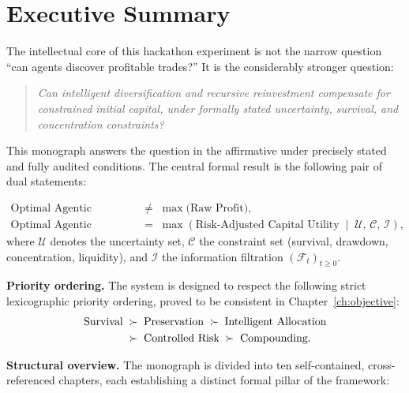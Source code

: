 \documentclass[12pt,openany]{book}
\numberwithin{equation}{chapter}
\theoremstyle{plain}
\theoremstyle{definition}
\theoremstyle{remark}
\numberwithin{equation}{chapter}
\theoremstyle{plain}
\begin{document}
\chapter*{Executive Summary}

\noindent
The intellectual core of this hackathon experiment is not the narrow
question ``can agents discover profitable trades?''  It is the
considerably stronger question:

\begin{quote}
\emph{Can intelligent diversification and recursive reinvestment
compensate for constrained initial capital, under formally
stated uncertainty, survival, and concentration constraints?}
\end{quote}

\noindent
This monograph answers the question in the affirmative under precisely
stated and fully audited conditions.  The central formal result is the
following pair of dual statements:

\begin{align}
  \text{Optimal Agentic Trading}
    &\;\neq\; \max\!\bigl(\text{Raw Profit}\bigr),
  \label{eq:exec-neq} \\[4pt]
  \text{Optimal Agentic Trading}
    &\;=\; \max\!\left(
        \text{Risk-Adjusted Capital Utility}
        \;\middle|\;
        \mathcal{U},\, \mathcal{C},\, \mathcal{I}
      \right),
  \label{eq:exec-eq}
\end{align}
where $\mathcal{U}$ denotes the uncertainty set,
$\mathcal{C}$ the constraint set (survival, drawdown, concentration,
liquidity), and $\mathcal{I}$ the information filtration
$(\mathcal{F}_t)_{t \ge 0}$.

\medskip
\noindent
\textbf{Priority ordering.}\enspace
The system is designed to respect the following strict lexicographic
priority ordering, proved to be consistent in
Chapter~\ref{ch:objective}:
\begin{align}
  \text{Survival}
    &\;\succ\; \text{Preservation}
     \;\succ\; \text{Intelligent Allocation} \notag \\
    &\;\succ\; \text{Controlled Risk}
     \;\succ\; \text{Compounding}.
  \label{eq:priority}
\end{align}

\medskip
\noindent
\textbf{Structural overview.}\enspace
The monograph is divided into ten self-contained, cross-referenced
chapters, each establishing a distinct formal pillar of the framework:
\end{document}
